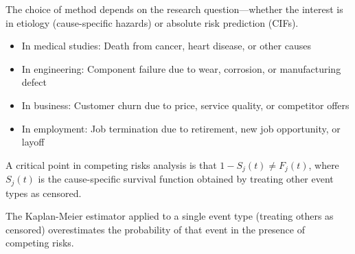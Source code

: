The choice of method depends on the research question—whether the interest is in etiology (cause-specific hazards) or absolute risk prediction (CIFs).

\begin{examplebox}[title=Examples of Competing Risks]
  \begin{itemize}
  \item In medical studies: Death from cancer, heart disease, or other causes
  \item In engineering: Component failure due to wear, corrosion, or manufacturing defect
  \item In business: Customer churn due to price, service quality, or competitor offers
  \item In employment: Job termination due to retirement, new job opportunity, or layoff
  \end{itemize}
\end{examplebox}

\begin{notebox}[title=Important Note on Competing Risks]
A critical point in competing risks analysis is that $1 - S_j(t) \neq F_j(t)$, where $S_j(t)$ is the cause-specific survival function obtained by treating other event types as censored.

The Kaplan-Meier estimator applied to a single event type (treating others as censored) overestimates the probability of that event in the presence of competing risks.
\end{notebox}

